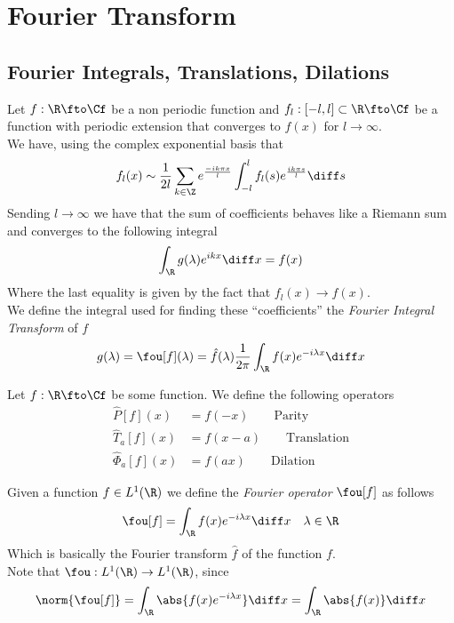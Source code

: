 \documentclass[../mmf.tex]{subfiles}
\begin{document}
\section{Fourier Transform}
\subsection{Fourier Integrals, Translations, Dilations}
\begin{prop}
	Let $f:\R\fto\Cf$ be a non periodic function and $f_l:[-l,l]\subset\R\fto\Cf$ be a function with periodic extension that converges to $f(x)$ for $l\to\infty$.\\
	We have, using the complex exponential basis that
	\begin{equation*}
		f_l(x)\sim\frac{1}{2l}\sum_{k\in\Z}e^{\frac{-ik\pi x}{l}}\int_{-l}^{l}f_l(s)e^{\frac{ik\pi s}{l}}\diff s
	\end{equation*}
	Sending $l\to\infty$ we have that the sum of coefficients behaves like a Riemann sum and converges to the following integral
	\begin{equation*}
		\int_{\R}^{}g(\lambda)e^{ikx}\diff x=f(x)
	\end{equation*}
	Where the last equality is given by the fact that $f_l(x)\to f(x)$.\\
	We define the integral used for finding these ``coefficients'' the \textit{Fourier Integral Transform} of $f$
	\begin{equation*}
		g(\lambda)=\fou[f](\lambda)=\hat{f}(\lambda)\frac{1}{2\pi}\int_{\R}f(x)e^{-i\lambda x}\diff x
	\end{equation*}
\end{prop}
\begin{dfn}
	Let $f:\R\fto\Cf$ be some function. We define the following operators
	\begin{equation*}
		\begin{aligned}
			\hat{P}[f](x)&=f(-x)\qquad\text{Parity}\\
			\hat{T}_a[f](x)&=f(x-a)\qquad\text{Translation}\\
			\hat{\Phi}_a[f](x)&=f(ax)\qquad\text{Dilation}
		\end{aligned}
	\end{equation*}
\end{dfn}
\begin{dfn}
	Given a function $f\in L^1(\R)$ we define the \textit{Fourier operator} $\fou[f]$ as follows
	\begin{equation*}
		\fou[f]=\int_{\R}^{}f(x)e^{-i\lambda x}\diff x\quad\lambda\in\R
	\end{equation*}
	Which is basically the Fourier transform $\hat{f}$ of the function $f$.\\
	Note that $\fou:L^1(\R)\to L^1(\R)$, since
	\begin{equation*}
		\norm{\fou[f]}=\int_{\R}^{}\abs{f(x)e^{-i\lambda x}}\diff x=\int_{\R}^{}\abs{f(x)}\diff x
	\end{equation*}
\end{dfn}
\end{document}
